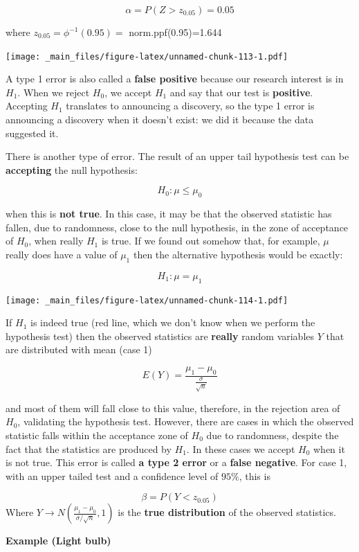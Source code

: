\documentclass[
]{book}
\begin{document}
\[\alpha = P(Z> z_{0.05})=0.05\]

where \(z_{0.05}=\phi^{-1}(0.95)=\) norm.ppf(0.95)=1.644

\texttt{[image: \_main\_files/figure-latex/unnamed-chunk-113-1.pdf]}

A type 1 error is also called a \textbf{false positive} because our research interest is in \(H_1\). When we reject \(H_0\), we accept \(H_1\) and say that our test is \textbf{positive}. Accepting \(H_1\) translates to announcing a discovery, so the type 1 error is announcing a discovery when it doesn't exist: we did it because the data suggested it.

There is another type of error. The result of an upper tail hypothesis test can be \textbf{accepting} the null hypothesis:

\[H_0: \mu\leq\mu_0\]

when this is \textbf{not true}. In this case, it may be that the observed statistic has fallen, due to randomness, close to the null hypothesis, in the zone of acceptance of \(H_0\), when really \(H_1\) is true. If we found out somehow that, for example, \(\mu\) really does have a value of \(\mu_1\) then the alternative hypothesis would be exactly:

\[H_1: \mu=\mu_1\]

\texttt{[image: \_main\_files/figure-latex/unnamed-chunk-114-1.pdf]}

If \(H_1\) is indeed true (red line, which we don't know when we perform the hypothesis test) then the observed statistics are \textbf{really} random variables \(Y\) that are distributed with mean (case 1)

\[E(Y)=\frac{\mu_1-\mu_0}{\frac{\sigma}{\sqrt{n}}}\]

and most of them will fall close to this value, therefore, in the rejection area of \(H_0\), validating the hypothesis test. However, there are cases in which the observed statistic falls within the acceptance zone of \(H_0\) due to randomness, despite the fact that the statistics are produced by \(H_1\). In these cases we accept \(H_0\) when it is not true. This error is called \textbf{a type 2 error} or a \textbf{false negative}. For case 1, with an upper tailed test and a confidence level of \(95\%\), this is

\[\beta= P(Y < z_{0.05})\]
Where \(Y \rightarrow N(\frac{\mu_1-\mu_0}{\sigma/\sqrt{n}},1)\) is the \textbf{true distribution} of the observed statistics.

\textbf{Example (Light bulb)}
\end{document}
